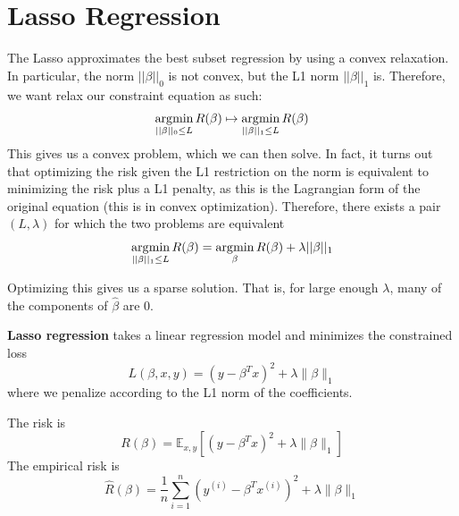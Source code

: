 \section{Lasso Regression} 

  The Lasso approximates the best subset regression by using a convex relaxation. In particular, the norm $||\beta||_0$ is not convex, but the L1 norm $||\beta||_1$ is. Therefore, we want relax our constraint equation as such: 
  \begin{equation}
    \operatorname*{\arg\!\min}_{||\beta||_0 \leq L} R(\beta) \mapsto \operatorname*{\arg\!\min}_{||\beta||_1 \leq L} R(\beta)
  \end{equation}
  This gives us a convex problem, which we can then solve. In fact, it turns out that optimizing the risk given the L1 restriction on the norm is equivalent to minimizing the risk plus a L1 penalty, as this is the Lagrangian form of the original equation (this is in convex optimization). Therefore, there exists a pair $(L, \lambda)$ for which the two problems are equivalent 
  \begin{equation}
    \operatorname*{\arg\!\min}_{||\beta||_1 \leq L} R(\beta) = \operatorname*{\arg\!\min}_{\beta} R(\beta) + \lambda ||\beta||_1
  \end{equation}

  Optimizing this gives us a sparse solution. That is, for large enough $\lambda$, many of the components of $\hat{\beta}$ are $0$. 

  \begin{definition}
    \textbf{Lasso regression} takes a linear regression model and minimizes the constrained loss 
    \begin{equation}
      L(\beta, x, y) = (y - \beta^T x)^2 + \lambda \|\beta\|_1
    \end{equation}
    where we penalize according to the L1 norm of the coefficients. 
  \end{definition}

  \begin{theorem}[Risk]
    The risk is 
    \begin{equation}
      R (\beta) = \mathbb{E}_{x, y} \left[ (y - \beta^T x)^2 + \lambda \|\beta\|_1 \right]
    \end{equation}
    The empirical risk is 
    \begin{equation}
      \hat{R} (\beta) = \frac{1}{n} \sum_{i=1}^n (y^{(i)} - \beta^T x^{(i)})^2 + \lambda \|\beta\|_1
    \end{equation}
  \end{theorem}

